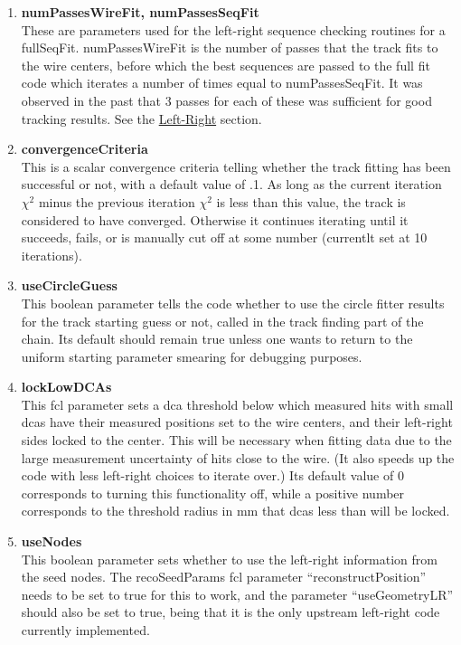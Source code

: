 \begin{enumerate}
      \item{\bf{numPassesWireFit, numPassesSeqFit}} \\
      These are parameters used for the left-right sequence checking routines for a fullSeqFit. numPassesWireFit is the number of passes that the track fits to the wire centers, before which the best sequences are passed to the full fit code which iterates a number of times equal to numPassesSeqFit. It was observed in the past that 3 passes for each of these was sufficient for good tracking results. See the \hyperref[sec:LR]{Left-Right} section.
 
      \item{\bf{convergenceCriteria}} \\
      This is a scalar convergence criteria telling whether the track fitting has been successful or not, with a default value of .1. As long as the current iteration $\chi^{2}$ minus the previous iteration $\chi^{2}$ is less than this value, the track is considered to have converged. Otherwise it continues iterating until it succeeds, fails, or is manually cut off at some number (currentlt set at 10 iterations).

      \item{\bf{useCircleGuess}} \\
      This boolean parameter tells the code whether to use the circle fitter results for the track starting guess or not, called in the track finding part of the chain. Its default should remain true unless one wants to return to the uniform starting parameter smearing for debugging purposes.

      \item{\bf{lockLowDCAs}} \\
      This fcl parameter sets a dca threshold below which measured hits with small dcas have their measured positions set to the wire centers, and their left-right sides locked to the center. This will be necessary when fitting data due to the large measurement uncertainty of hits close to the wire. (It also speeds up the code with less left-right choices to iterate over.) Its default value of 0 corresponds to turning this functionality off, while a positive number corresponds to the threshold radius in mm that dcas less than will be locked.

      \item{\bf{useNodes}} \\
      This boolean parameter sets whether to use the left-right information from the seed nodes. The recoSeedParams fcl parameter ``reconstructPosition'' needs to be set to true for this to work, and the parameter ``useGeometryLR'' should also be set to true, being that it is the only upstream left-right code currently implemented.


\end{enumerate}
